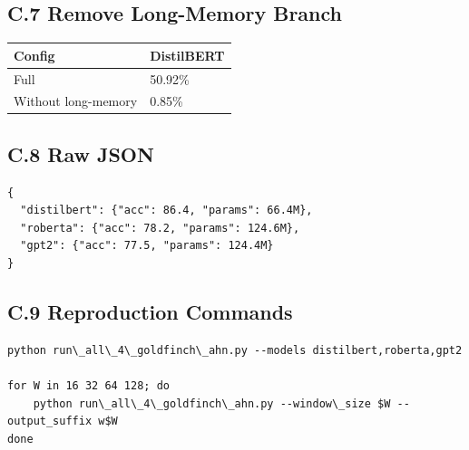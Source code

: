 \subsection{C.7 Remove Long-Memory Branch}

\begin{table}[H]
\centering
\small
\begin{tabular}{ll}
\toprule
\textbf{Config} & \textbf{DistilBERT} \\
\midrule
Full & 50.92\% \\
Without long-memory & 0.85\% \\
\bottomrule
\end{tabular}
\end{table}

\subsection{C.8 Raw JSON}

\begin{lstlisting}
{
  "distilbert": {"acc": 86.4, "params": 66.4M},
  "roberta": {"acc": 78.2, "params": 124.6M},
  "gpt2": {"acc": 77.5, "params": 124.4M}
}
\end{lstlisting}

\subsection{C.9 Reproduction Commands}

\begin{lstlisting}
python run\_all\_4\_goldfinch\_ahn.py --models distilbert,roberta,gpt2

for W in 16 32 64 128; do
    python run\_all\_4\_goldfinch\_ahn.py --window\_size $W --output_suffix w$W
done
\end{lstlisting}


